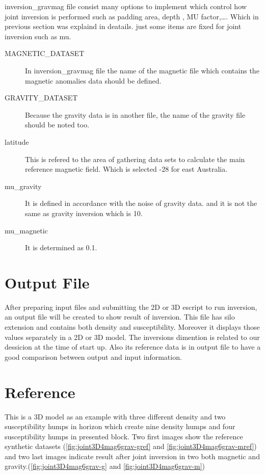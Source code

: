 inversion_gravmag file consist many options to implement which control how joint inversion is performed such as padding area, depth , MU factor,\ldots. Which in previous section was explaind in deatails. just some items are fixed for joint inversion such as mu.


\begin{description} 
\item[MAGNETIC_DATASET]In inversion_gravmag file the name of the magnetic file which contains the magnetic anomalies data should be defined.

\item[GRAVITY_DATASET]Because the gravity data is in another file, the name of the gravity file should be noted too.
	
\item[latitude]This is refered to the area of gathering data sets to calculate the main reference magnetic field. Which is selected -28 for east Australia.


\item[mu_gravity]It is defined in accordance with the noise of gravity data. and it is not the same as gravity inversion which is 10.

\item[mu_magnetic]It is determined as 0.1.

\end{description}


\section{Output File}

After preparing input files and submitting the 2D or 3D escript to run inversion, an output file will be created to show result of inversion. This file has silo extension and contains both density and susceptibility. Moreover it displays those values separately in a 2D or 3D model. The inversions dimention is related to our dessicion at the time of start up. Also its reference data is in output file to have a good comparison between output and input information.

\section{Reference}

This is a 3D model as an example with three different density and two susceptibility humps in horizon which create nine density humps and four susceptibility humps in presented block. Two first images show the reference synthetic datasets (\ref{fig:joint3D4mag6grav-gref} and \ref{fig:joint3D4mag6grav-mref}) and two last images indicate result after joint inversion in two both magnetic and gravity.(\ref{fig:joint3D4mag6grav-g} and \ref{fig:joint3D4mag6grav-m})
 
